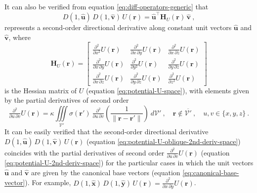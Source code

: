 It can also be verified from equation \ref{eq:diff-operators-generic} that 
\begin{equation}
	D(1, \hat{\mathbf{u}}) \, D(1, \hat{\mathbf{v}}) \, U(\mathbf{r}) = 
	\hat{\mathbf{u}}^{\top} \mathbf{H}_{U}(\mathbf{r}) \, \hat{\mathbf{v}} \: ,
	\label{eq:potential-U-oblique-2nd-deriv-space}
\end{equation}
represents a second-order directional derivative along constant unit vectors $\hat{\mathbf{u}}$ and
$\hat{\mathbf{v}}$, where 
\begin{equation}
	\mathbf{H}_{U}(\mathbf{r}) = 
	\begin{bmatrix}
		\tfrac{\partial^{2}}{\partial x^{2}} U(\mathbf{r}) & 
		\tfrac{\partial^{2}}{\partial x \, \partial y} U(\mathbf{r}) & 
		\tfrac{\partial^{2}}{\partial x \, \partial z} U(\mathbf{r}) \\
		\tfrac{\partial^{2}}{\partial x \, \partial y} U(\mathbf{r}) & 
		\tfrac{\partial^{2}}{\partial y^{2}} U(\mathbf{r}) & 
		\tfrac{\partial^{2}}{\partial y \, \partial z} U(\mathbf{r}) \\
		\tfrac{\partial^{2}}{\partial x \, \partial z} U(\mathbf{r}) & 
		\tfrac{\partial^{2}}{\partial y \, \partial z} U(\mathbf{r}) & 
		\tfrac{\partial^{2}}{\partial z^{2}} U(\mathbf{r})
	\end{bmatrix}
	\label{eq:potential-U-Hessian}
\end{equation}
is the Hessian matrix \citep[e.g.,][ p. 158]{kaplan2002} of $U$ (equation \ref{eq:potential-U-space}),
with elements given by the partial derivatives of second order
\begin{equation}
	\tfrac{\partial^{2}}{\partial u \, \partial v} U(\mathbf{r}) = \kappa \iiint\limits_{\mathcal{V}'}
	\sigma(\mathbf{r}') \: 
	\tfrac{\partial^{2}}{\partial u \, \partial v} \left( \frac{1}{\| \mathbf{r} - \mathbf{r}'\|} \right)
	\: d\mathcal{V}' \: , \quad \mathbf{r} \notin \overline{\mathcal{V}'} \: , \quad u, v \in \{ x, y, z \} \: .
	\label{eq:potential-U-2nd-deriv-space}
\end{equation} 
It can be easily verified that 
the second-order directional derivative $D(1, \hat{\mathbf{u}}) \, D(1, \hat{\mathbf{v}}) \, U(\mathbf{r})$ 
(equation \ref{eq:potential-U-oblique-2nd-deriv-space})
coincides with the partial derivatives of second order $\tfrac{\partial^{2}}{\partial u \, \partial v} U(\mathbf{r})$ 
(equation \ref{eq:potential-U-2nd-deriv-space}) for the particular cases in which the unit vectors 
$\hat{\mathbf{u}}$ and $\hat{\mathbf{v}}$ are given by the canonical base vectors (equation \ref{eq:canonical-base-vector}).
For example, $D(1, \hat{\mathbf{x}}) \, D(1, \hat{\mathbf{y}}) \, U(\mathbf{r}) = \tfrac{\partial^{2}}{\partial x \, \partial y} U(\mathbf{r})$.


